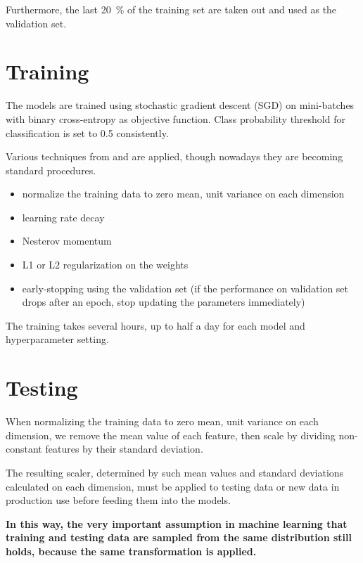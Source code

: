 \documentclass[11pt,a4paper]{report}
\begin{document}
Furthermore, the last \SI{20}{\percent} of the training set are taken out and used as the validation set.

\section{Training}

The models are trained using stochastic gradient descent (SGD) on mini-batches with binary cross-entropy as objective function.
Class probability threshold for classification is set to 0.5 consistently.

Various techniques from \parencite{lecun2012efficient} and \parencite{orr2003neural} are applied, though nowadays they are becoming standard procedures.

\begin{itemize}
  \item normalize the training data to zero mean, unit variance on each dimension
  \item learning rate decay
  \item Nesterov momentum \parencite{nesterov1983method}
  \item L1 or L2 regularization on the weights
  \item early-stopping using the validation set (if the performance on validation set drops after an epoch, stop updating the parameters immediately)
\end{itemize}

The training takes several hours, up to half a day for each model and hyperparameter setting.

\section{Testing}

When normalizing the training data to zero mean, unit variance on each dimension, we remove the mean value of each feature, then scale by dividing non-constant features by their standard deviation.

The resulting scaler, determined by such mean values and standard deviations calculated on each dimension, must be applied to testing data or new data in production use before feeding them into the models.

\bigskip

\textbf{In this way, the very important assumption in machine learning that training and testing data are sampled from the same distribution still holds, because the same transformation is applied.}
\end{document}
